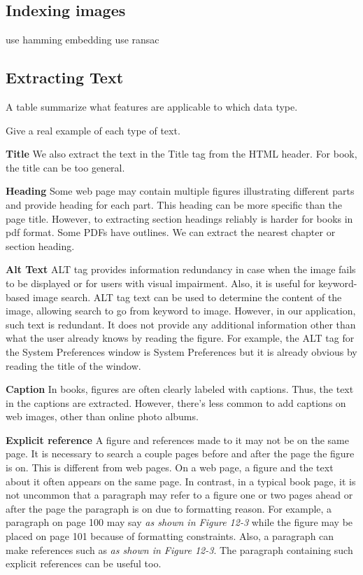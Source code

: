 \subsection{Indexing images}
        use hamming embedding
        use ransac

\subsection{Extracting Text}

A table summarize what features are applicable to which data type.

Give a real example of each type of text.

\textbf{Title} We also extract the text in the Title tag from the
HTML header. For book, the title can be too general.

\textbf{Heading} Some web page may contain multiple figures
illustrating different parts and provide heading for each part.
This heading can be more specific than the page title. However, to
extracting section headings reliably is harder for books in pdf
format. Some PDFs have outlines. We can extract the nearest
chapter or section heading.

\textbf{Alt Text} ALT tag provides information redundancy in case
when the image fails to be displayed or for users with visual
impairment. Also, it is useful for keyword-based image search. ALT
tag text can be used to determine the content of the image,
allowing search to go from keyword to image. However, in our
application, such text is redundant. It does not provide any
additional information other than what the user already knows by
reading the figure. For example, the ALT tag for the System
Preferences window is System Preferences but it is already obvious
by reading the title of the window.

\textbf{Caption} In books, figures are often clearly labeled with
captions. Thus, the text in the captions are extracted. However,
there's less common to add captions on web images, other than
online photo albums.

\textbf{Explicit reference} A figure and references made to it may
not be on the same page. It is necessary to search a couple pages
before and after the page the figure is on. This is different from
web pages. On a web page, a figure and the text about it often
appears on the same page. In contrast, in a typical book page, it
is not uncommon that a paragraph may refer to a figure one or two
pages ahead or after the page the paragraph is on due to
formatting reason. For example, a paragraph on page 100 may say
\emph{as shown in Figure 12-3} while the figure may be placed on
page 101 because of formatting constraints. Also, a paragraph can
make references such as \emph{as shown in Figure 12-3}. The
paragraph containing such explicit references can be useful too.


